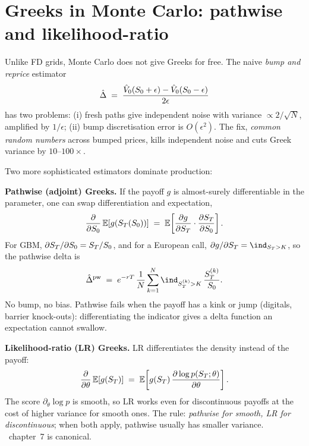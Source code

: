 \section{Greeks in Monte Carlo: pathwise and likelihood-ratio}
\label{sec:mc_greeks}

Unlike FD grids, Monte Carlo does not give Greeks for free.  The
naive \emph{bump and reprice} estimator
\begin{equation}
  \hat\Delta \;=\; \frac{\hat V_0(S_0 + \epsilon) - \hat V_0(S_0 - \epsilon)}{2\epsilon}
\end{equation}
has two problems: (i) fresh paths give independent noise with variance
$\propto 2/\sqrt N$, amplified by $1/\epsilon$; (ii) bump discretisation
error is $O(\epsilon^2)$.  The fix, \emph{common random numbers}
across bumped prices, kills independent noise and cuts Greek
variance by $10$--$100\times$.

Two more sophisticated estimators dominate production:

\textbf{Pathwise (adjoint) Greeks.}  If the payoff $g$ is almost-surely
differentiable in the parameter, one can swap differentiation and
expectation,
\begin{equation}
  \frac{\partial}{\partial S_0}\, \mathbb{E}[g(S_T(S_0))]
  \;=\; \mathbb{E}\!\left[ \frac{\partial g}{\partial S_T}
                   \cdot \frac{\partial S_T}{\partial S_0} \right].
\end{equation}
For GBM, $\partial S_T / \partial S_0 = S_T / S_0$,
and for a European call, $\partial g / \partial \Spx_\Tmat = \ind_{\Spx_\Tmat
> \Kstrike}$, so the pathwise delta is
\begin{equation}
  \hat \Delta^{\mathrm{pw}} \;=\; e^{-\rrf \Tmat}\, \frac{1}{N}
  \sum_{k=1}^N \ind_{\Spx_\Tmat^{(k)} > \Kstrike}\, \frac{\Spx_\Tmat^{(k)}}{\Spx_0}.
\end{equation}
No bump, no bias.  Pathwise fails when the payoff has a kink or jump
(digitals, barrier knock-outs): differentiating the indicator gives
a delta function an expectation cannot swallow.

\textbf{Likelihood-ratio (LR) Greeks.}  LR differentiates the density
instead of the payoff:
\begin{equation}
  \frac{\partial}{\partial \theta}\, \mathbb{E}[g(S_T)]
  \;=\; \mathbb{E}\!\left[ g(S_T)\, \frac{\partial \log p(S_T; \theta)}{\partial \theta} \right].
\end{equation}
The score $\partial_\theta \log p$ is smooth, so LR works even for
discontinuous payoffs at the cost of higher variance for smooth ones.
The rule: \emph{pathwise for smooth, LR for discontinuous}; when both
apply, pathwise usually has smaller variance.  \citeGlasserman\
chapter~7 is canonical.

